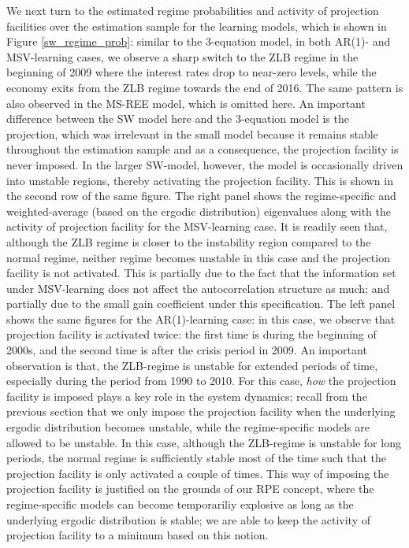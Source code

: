 \documentclass[12pt,reqno]{article}
\numberwithin{equation}{section}
\begin{document}
We next turn to the estimated regime probabilities and activity of projection facilities over the estimation sample for the learning models, which is shown in Figure \ref{sw_regime_prob}: similar to the 3-equation model, in both AR(1)- and MSV-learning cases, we observe a sharp switch to the ZLB regime in the beginning of 2009 where the interest rates drop to near-zero levels, while the economy exits from the ZLB regime towards the end of 2016. The same pattern is also observed in the MS-REE model, which is omitted here. An important difference between the SW model here and the 3-equation model is the projection, which was irrelevant in the small model because it remains stable throughout the estimation sample and as a consequence, the projection facility is never imposed. In the larger SW-model, however, the model is occasionally driven into unstable regions, thereby activating the projection facility. This is shown in the second row of the same figure. The right panel shows the regime-specific and weighted-average (based on the ergodic distribution) eigenvalues along with the activity of projection facility for the MSV-learning case. It is readily seen that, although the ZLB regime is closer to the instability region compared to the normal regime, neither regime becomes unstable in this case and the projection facility is not activated. This is partially due to the fact that the information set under MSV-learning does not affect the autocorrelation structure as much; and partially due to the small gain coefficient under this specification. The left panel shows the same figures for the AR(1)-learning case: in this case, we observe that projection facility is activated twice: the first time is during the beginning of 2000s, and the second time is after the crisis period in 2009. An important observation is that, the ZLB-regime is unstable for extended periods of time, especially during the period from 1990 to 2010. For this case, \textit{how} the projection facility is imposed plays a key role in the system dynamics: recall from the previous section that we only impose the projection facility when the underlying ergodic distribution becomes unstable, while the regime-specific models are allowed to be unstable. In this case, although the ZLB-regime is unstable for long periods, the normal regime is sufficiently stable most of the time such that the projection facility is only activated a couple of times. This way of imposing the projection facility is justified on the grounds of our RPE concept, where the regime-specific models can become temporariliy explosive as long as the underlying ergodic distribution is stable; we are able to keep the activity of projection facility to a minimum based on this notion. \\
\end{document}
